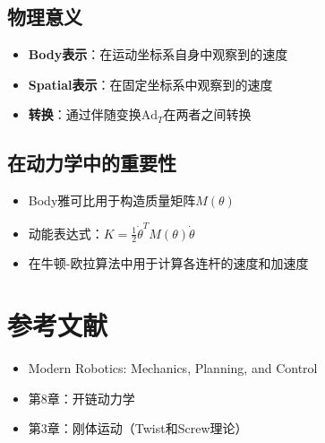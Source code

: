 \documentclass[12pt,a4paper]{article}
\begin{document}
\subsection{物理意义}

\begin{itemize}
\item \textbf{Body表示}：在运动坐标系自身中观察到的速度
\item \textbf{Spatial表示}：在固定坐标系中观察到的速度
\item \textbf{转换}：通过伴随变换$\text{Ad}_T$在两者之间转换
\end{itemize}

\subsection{在动力学中的重要性}

\begin{itemize}
\item Body雅可比用于构造质量矩阵$M(\theta)$
\item 动能表达式：$K = \frac{1}{2}\dot{\theta}^T M(\theta) \dot{\theta}$
\item 在牛顿-欧拉算法中用于计算各连杆的速度和加速度
\end{itemize}

\section{参考文献}

\begin{itemize}
\item Modern Robotics: Mechanics, Planning, and Control
\item 第8章：开链动力学
\item 第3章：刚体运动（Twist和Screw理论）
\end{itemize}
\end{document}
